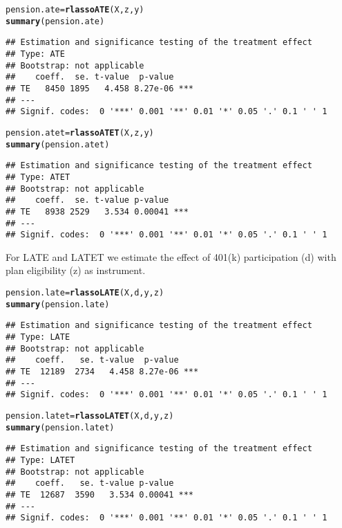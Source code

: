 \documentclass{amsart}\usepackage[]{graphicx}\usepackage[]{color}
\makeatletter
\newcommand{\hlstd}[1]{\textcolor[rgb]{0.345,0.345,0.345}{#1}}%
\newcommand{\hlkwb}[1]{\textcolor[rgb]{0.69,0.353,0.396}{#1}}%
\newcommand{\hlkwd}[1]{\textcolor[rgb]{0.737,0.353,0.396}{\textbf{#1}}}%
\newenvironment{kframe}{%
 \def\at@end@of@kframe{}%
 \ifinner\ifhmode%
  \def\at@end@of@kframe{\end{minipage}}%
  \begin{minipage}{\columnwidth}%
 \fi\fi%
 \def\FrameCommand##1{\hskip\@totalleftmargin \hskip-\fboxsep
 \colorbox{shadecolor}{##1}\hskip-\fboxsep
     \hskip-\linewidth \hskip-\@totalleftmargin \hskip\columnwidth}%
 \MakeFramed {\advance\hsize-\width
   \@totalleftmargin\z@ \linewidth\hsize
   \@setminipage}}%
 {\par\unskip\endMakeFramed%
 \at@end@of@kframe}
\newenvironment{knitrout}{}{} %
\makeatother
\begin{document}
\begin{knitrout}
\color{fgcolor}\begin{kframe}
\begin{alltt}
\hlstd{pension.ate} \hlkwb{=}  \hlkwd{rlassoATE}\hlstd{(X,z,y)}
\hlkwd{summary}\hlstd{(pension.ate)}
\end{alltt}
\begin{verbatim}
## Estimation and significance testing of the treatment effect 
## Type: ATE 
## Bootstrap: not applicable 
##    coeff.  se. t-value  p-value    
## TE   8450 1895   4.458 8.27e-06 ***
## ---
## Signif. codes:  0 '***' 0.001 '**' 0.01 '*' 0.05 '.' 0.1 ' ' 1
\end{verbatim}
\begin{alltt}
\hlstd{pension.atet} \hlkwb{=}  \hlkwd{rlassoATET}\hlstd{(X,z,y)}
\hlkwd{summary}\hlstd{(pension.atet)}
\end{alltt}
\begin{verbatim}
## Estimation and significance testing of the treatment effect 
## Type: ATET 
## Bootstrap: not applicable 
##    coeff.  se. t-value p-value    
## TE   8938 2529   3.534 0.00041 ***
## ---
## Signif. codes:  0 '***' 0.001 '**' 0.01 '*' 0.05 '.' 0.1 ' ' 1
\end{verbatim}
\end{kframe}
\end{knitrout}
For LATE and LATET we estimate the effect of 401(k) participation (d) with plan eligibility (z) as instrument.

\begin{knitrout}
\color{fgcolor}\begin{kframe}
\begin{alltt}
\hlstd{pension.late} \hlkwb{=} \hlkwd{rlassoLATE}\hlstd{(X,d,y,z)}
\hlkwd{summary}\hlstd{(pension.late)}
\end{alltt}
\begin{verbatim}
## Estimation and significance testing of the treatment effect 
## Type: LATE 
## Bootstrap: not applicable 
##    coeff.   se. t-value  p-value    
## TE  12189  2734   4.458 8.27e-06 ***
## ---
## Signif. codes:  0 '***' 0.001 '**' 0.01 '*' 0.05 '.' 0.1 ' ' 1
\end{verbatim}
\begin{alltt}
\hlstd{pension.latet} \hlkwb{=} \hlkwd{rlassoLATET}\hlstd{(X,d,y,z)}
\hlkwd{summary}\hlstd{(pension.latet)}
\end{alltt}
\begin{verbatim}
## Estimation and significance testing of the treatment effect 
## Type: LATET 
## Bootstrap: not applicable 
##    coeff.   se. t-value p-value    
## TE  12687  3590   3.534 0.00041 ***
## ---
## Signif. codes:  0 '***' 0.001 '**' 0.01 '*' 0.05 '.' 0.1 ' ' 1
\end{verbatim}
\end{kframe}
\end{knitrout}
\end{document}
